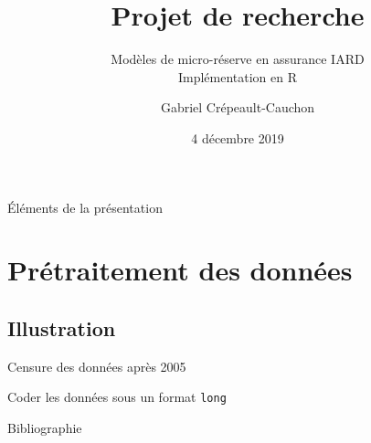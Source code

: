 \documentclass[aspectratio=169, 12pt, french]{beamer}
\title[\hyperlink{start}{ACT 2105}]{\Huge Projet de recherche}
\subtitle{Modèles de micro-réserve en assurance IARD  \\ Implémentation en R}
\author{Gabriel Crépeault-Cauchon}
\institute{Sous la direction de \\ Marie-Pier Côté, professeure adjointe \\ Université Laval}
\date{4 décembre 2019}
\begin{document}

\begin{frame}
\titlepage
\end{frame}

\begin{frame}{Éléments de la présentation}
\tableofcontents
\end{frame}

\section{Prétraitement des données}





\subsection{Illustration}
\begin{frame}
\noindent
\begin{minipage}{.6\linewidth}
\scalebox{0.6}{}
\end{minipage}
\hfill
\begin{minipage}{.3\linewidth}
\begin{itemize}
 {\item Censure des données après 2005}
 {\item Coder les données sous un format \texttt{long}}
\end{itemize}
\end{minipage}

\end{frame}









\begin{frame}{Bibliographie}

\end{frame}

\end{document}
